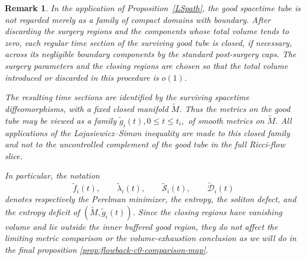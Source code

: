\documentclass{amsart}
\newtheorem{remark}{Remark}
\begin{document}
\begin{remark}
\label{rem:closed-good-tube}
In the application of Proposition~\ref{LSpath}, the good spacetime tube
is not regarded merely as a family of compact domains with boundary.
After discarding the surgery regions and the components whose total
volume tends to zero, each regular time section of the surviving good
tube is closed, if necessary, across its negligible boundary components
by the standard post-surgery caps.  The surgery parameters and the
closing regions are chosen so that the total volume introduced or
discarded in this procedure is \(o(1)\).

\noindent The resulting time sections are identified by the surviving spacetime
diffeomorphisms, with a fixed closed manifold
$\widetilde M$.
Thus the metrics on the good tube may be viewed as a family
$\widetilde g_i(t), 0\leq t\leq t_i,$
of smooth metrics on \(\widetilde M\).  All applications of the
Lojasiewicz--Simon inequality are made to this closed family and not to
the uncontrolled complement of the good tube in the full Ricci-flow
slice.

\noindent In particular, the notation
\[
        \widetilde f_i(t),\qquad
        \widetilde\lambda_i(t),\qquad
        \widetilde{\mathcal S}_i(t),\qquad
        \widetilde{\mathcal D}_i(t)
\]
denotes respectively the Perelman minimizer, the entropy, the soliton
defect, and the entropy deficit of
\((\widetilde M,\widetilde g_i(t))\).  Since the closing regions have
vanishing volume and lie outside the inner buffered good region, they do
not affect the limiting metric comparison or the volume-exhaustion
conclusion as we will do in the final proposition \ref{prop:flowback-c0-comparison-map}.
\end{remark}
\end{document}

